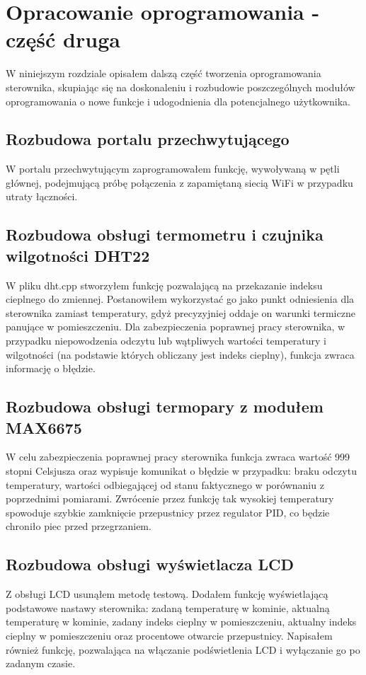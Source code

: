 \documentclass[11pt]{report}
\begin{document}
 \chapter{Opracowanie oprogramowania - część druga}\label{ch:oprog:2}
 W niniejszym rozdziale opisałem dalszą część tworzenia oprogramowania sterownika, skupiając się na doskonaleniu i rozbudowie poszczególnych modułów oprogramowania o nowe funkcje i udogodnienia dla potencjalnego użytkownika.

  \section{Rozbudowa portalu przechwytującego}
  W portalu przechwytującym zaprogramowałem funkcję, wywoływaną w pętli głównej, podejmującą próbę połączenia z zapamiętaną siecią WiFi w przypadku utraty łączności.
  
 \section{Rozbudowa obsługi termometru i czujnika wilgotności DHT22}
W pliku dht.cpp stworzyłem funkcję pozwalającą na przekazanie indeksu cieplnego do zmiennej. Postanowiłem wykorzystać go jako punkt odniesienia dla sterownika zamiast temperatury, gdyż precyzyjniej oddaje on warunki termiczne panujące w pomieszczeniu. Dla zabezpieczenia poprawnej pracy sterownika, w przypadku niepowodzenia odczytu lub wątpliwych wartości temperatury i wilgotności (na podstawie których obliczany jest indeks cieplny), funkcja zwraca informację o błędzie.

 \section{Rozbudowa obsługi termopary z modułem MAX6675}
 W celu zabezpieczenia poprawnej pracy sterownika funkcja zwraca wartość 999 stopni Celsjusza oraz wypisuje komunikat o błędzie w przypadku: braku odczytu temperatury, wartości odbiegającej od stanu faktycznego w porównaniu z poprzednimi pomiarami. Zwrócenie przez funkcję tak wysokiej temperatury spowoduje szybkie zamknięcie przepustnicy przez regulator PID, co będzie chroniło piec przed przegrzaniem.
 
 \section{Rozbudowa obsługi wyświetlacza LCD}
 Z obsługi LCD usunąłem metodę testową. Dodałem funkcję wyświetlającą podstawowe nastawy sterownika: zadaną temperaturę w kominie, aktualną temperaturę w kominie, zadany indeks cieplny w pomieszczeniu, aktualny indeks cieplny w pomieszczeniu oraz procentowe otwarcie przepustnicy. Napisałem również funkcję, pozwalająca na włączanie podświetlenia LCD i wyłączanie go po zadanym czasie.
\end{document}
